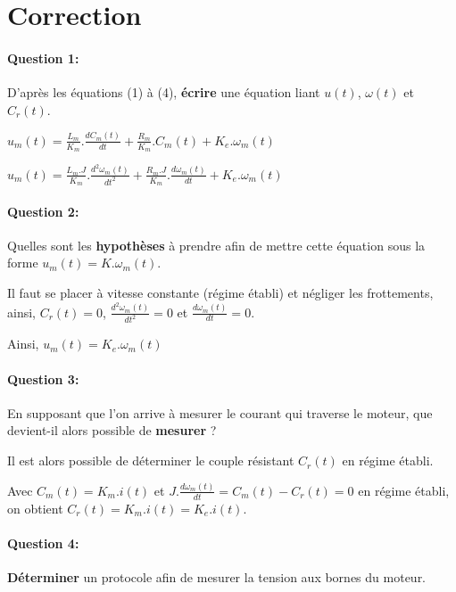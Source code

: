 \newpage

\pagestyle{correction}

\section{Correction}

\paragraph{Question 1:} D'après les équations (1) à (4), \textbf{écrire} une équation liant $u(t)$, $\omega(t)$ et $C_r(t)$.

$u_m(t)=\frac{L_m}{K_m}.\frac{dC_m(t)}{dt}+\frac{R_m}{K_m}.C_m(t)+K_e.\omega_m(t)$

$u_m(t)=\frac{L_m.J}{K_m}.\frac{d^2\omega_m(t)}{dt^2}+\frac{R_m.J}{K_m}.\frac{d\omega_m(t)}{dt}+K_e.\omega_m(t)$


\paragraph{Question 2:} Quelles sont les \textbf{hypothèses} à prendre afin de mettre cette équation sous la forme $u_m(t)=K.\omega_m(t)$.

Il faut se placer à vitesse constante (régime établi) et négliger les frottements, ainsi, $C_r(t)=0$, $\frac{d^2\omega_m(t)}{dt^2}=0$ et $\frac{d\omega_m(t)}{dt}=0$.

Ainsi, $u_m(t)=K_e.\omega_m(t)$

\paragraph{Question 3:} En supposant que l'on arrive à mesurer le courant qui traverse le moteur, que devient-il alors possible de \textbf{mesurer} ?

Il est alors possible de déterminer le couple résistant $C_r(t)$ en régime établi.

Avec $C_m(t)=K_m.i(t)$ et $J.\frac{d\omega_m(t)}{dt}=C_m(t)-C_r(t)=0$ en régime établi, on obtient $C_r(t)=K_m.i(t)=K_e.i(t)$.

\newpage


\paragraph{Question 4:} \textbf{Déterminer} un protocole afin de mesurer la tension aux bornes du moteur.

